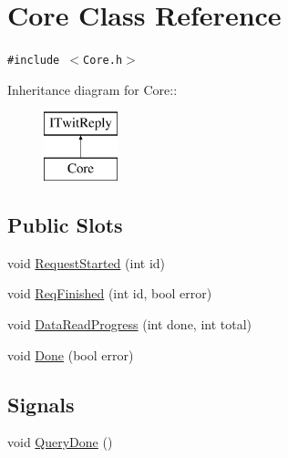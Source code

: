 \hypertarget{classCore}{
\section{Core Class Reference}
\label{classCore}
}
{\tt \#include $<$Core.h$>$}

Inheritance diagram for Core::\begin{figure}[H]
\begin{center}
\leavevmode
\includegraphics[height=2cm]{classCore}
\end{center}
\end{figure}
\subsection*{Public Slots}
\begin{CompactItemize}
\item 
void \hyperlink{classCore_2e3b63ac22f8fef5f2d2d5e9adc42cdd}{RequestStarted} (int id)
\item 
void \hyperlink{classCore_7b649f8d3aeae37e3f2e0eff65ab189f}{ReqFinished} (int id, bool error)
\item 
void \hyperlink{classCore_77844f4e1b5e81ff4a13bc22328a4258}{DataReadProgress} (int done, int total)
\item 
void \hyperlink{classCore_299d2e5e288da339e11f30500f473b16}{Done} (bool error)
\end{CompactItemize}
\subsection*{Signals}
\begin{CompactItemize}
\item 
void \hyperlink{classCore_c74c19f85f549851d3d7afd7e449770b}{QueryDone} ()
\end{CompactItemize}

